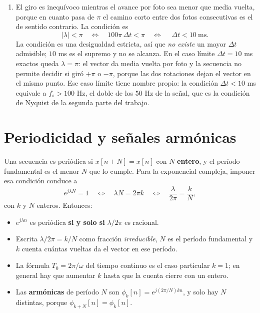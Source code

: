 \documentclass[10pt,a4paper]{article}
\newcommand{\tema}[1]{%
  \bigskip
  \section*{#1}
  \vspace{-0.6em}
}
\begin{document}
\begin{enumerate}
		\item El giro es inequívoco mientras el avance
		por foto sea menor que media vuelta, porque en cuanto pasa de $\pi$ el camino corto
		entre dos fotos consecutivas es el de sentido contrario. La condición es
		\[
			|\lambda| < \pi
			\quad\Longleftrightarrow\quad
			100\pi\,\Delta t < \pi
			\quad\Longleftrightarrow\quad
			\boxed{\;\Delta t < 10\ \text{ms}.\;}
		\]
		La condición es una desigualdad estricta, así que \emph{no existe} un mayor
		$\Delta t$ admisible; $10$ ms es el supremo y no se alcanza. En el caso
		límite $\Delta t = 10$ ms exactos queda $\lambda = \pi$: el vector da media vuelta por
		foto y la secuencia no permite decidir si giró $+\pi$ o $-\pi$, porque las dos
		rotaciones dejan el vector en el mismo punto. Ese caso límite tiene nombre propio: la
		condición $\Delta t < 10$ ms equivale a $f_s > 100$ Hz, el doble de los $50$ Hz de la
		señal, que es la condición de Nyquist de la segunda parte del trabajo.
	\end{enumerate}

	\tema{Periodicidad y señales armónicas}

	Una secuencia es periódica si $x[n+N]=x[n]$ con $N$ \textbf{entero}, y el período
	fundamental es el menor $N$ que lo cumple. Para la exponencial compleja, imponer esa
	condición conduce a
	\[
		e^{j\lambda N}=1
		\quad\Longleftrightarrow\quad
		\lambda N = 2\pi k
		\quad\Longleftrightarrow\quad
		\frac{\lambda}{2\pi}=\frac{k}{N},
	\]
	con $k$ y $N$ enteros. Entonces:

	\begin{itemize}[nosep]
		\item $e^{j\lambda n}$ es periódica \textbf{si y solo si} $\lambda/2\pi$ es
		      racional.
		\item Escrita $\lambda/2\pi = k/N$ como fracción \emph{irreducible}, $N$ es el
		      período fundamental y $k$ cuenta cuántas vueltas da el vector en ese período.
		\item La fórmula $T_0 = 2\pi/\omega$ del tiempo continuo es el caso particular
		      $k=1$; en general hay que aumentar $k$ hasta que la cuenta cierre con un entero.
		\item Las \textbf{armónicas} de período $N$ son $\phi_k[n]=e^{j(2\pi/N)kn}$, y solo
		      hay $N$ distintas, porque $\phi_{k+N}[n]=\phi_k[n]$.
	\end{itemize}
\end{document}
